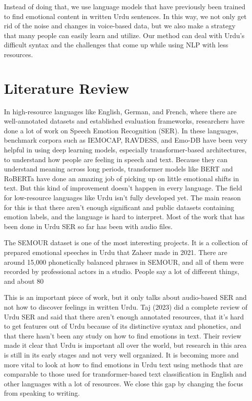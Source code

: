 \documentclass[12pt]{article}
\begin{document}
Instead of doing that, we use language models that have previously been trained to find emotional content in written Urdu sentences. In this way, we not only get rid of the noise and changes in voice-based data, but we also make a strategy that many people can easily learn and utilize. Our method can deal with Urdu's difficult syntax and the challenges that come up while using NLP with less resources.

\section{Literature Review}

In high-resource languages like English, German, and French, where there are well-annotated datasets and established evaluation frameworks, researchers have done a lot of work on Speech Emotion Recognition (SER). In these languages, benchmark corpora such as IEMOCAP, RAVDESS, and Emo-DB have been very helpful in using deep learning models, especially transformer-based architectures, to understand how people are feeling in speech and text. Because they can understand meaning across long periods, transformer models like BERT and RoBERTa have done an amazing job of picking up on little emotional shifts in text. But this kind of improvement doesn't happen in every language. The field for low-resource languages like Urdu isn't fully developed yet. The main reason for this is that there aren't enough significant and public datasets containing emotion labels, and the language is hard to interpret. Most of the work that has been done in Urdu SER so far has been with audio files.

The SEMOUR dataset is one of the most interesting projects. It is a collection of prepared emotional speeches in Urdu that Zaheer made in 2021. There are around 15,000 phonetically balanced phrases in SEMOUR, and all of them were recorded by professional actors in a studio. People say a lot of different things, and about 80%

This is an important piece of work, but it only talks about audio-based SER and not how to discover feelings in written Urdu. Taj (2023) did a complete review of Urdu SER and said that there aren't enough annotated resources, that it's hard to get features out of Urdu because of its distinctive syntax and phonetics, and that there hasn't been any study on how to find emotions in text. Their review made it clear that Urdu is important all over the world, but research in this area is still in its early stages and not very well organized. It is becoming more and more vital to look at how to find emotions in Urdu text using methods that are comparable to those used for transformer-based text classification in English and other languages with a lot of resources. We close this gap by changing the focus from speaking to writing.
\end{document}

